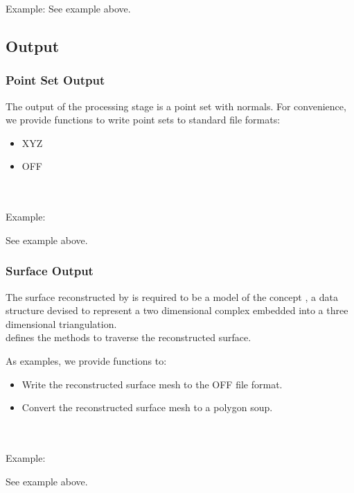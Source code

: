 Example:
See  example above.


\subsection{Output}

\subsubsection{Point Set Output}

The output of the processing stage is a point set with normals.
For convenience, we provide functions to write point sets to standard file formats:
\begin{itemize}
\item XYZ
\item OFF
\end{itemize}

  \\
  \\

Example:

See  example above.


\subsubsection{Surface Output}

The surface reconstructed by 
is required to be a model of the concept
,
a data structure devised to represent a two dimensional
complex embedded into a three dimensional triangulation.\\

 defines the methods to traverse the reconstructed surface.

As examples, we provide functions to:

\begin{itemize}
\item Write the reconstructed surface mesh to the 
      OFF file format.
\item Convert the reconstructed surface mesh to a
      polygon soup.
\end{itemize}

  \\
  \\

Example:

See  example above.






